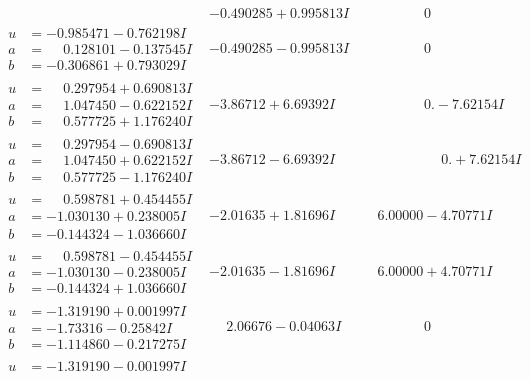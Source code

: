 \documentclass[1p]{elsarticle_modified}
\theoremstyle{definition}
\begin{document}
$$\begin{array}{c|c|c}
 & -0.490285 + 0.995813 I & \phantom{-0.000000 } 0 \\ \hline\begin{aligned}
u &= -0.985471 - 0.762198 I \\
a &= \phantom{-}0.128101 - 0.137545 I \\
b &= -0.306861 + 0.793029 I\end{aligned}
 & -0.490285 - 0.995813 I & \phantom{-0.000000 } 0 \\ \hline\begin{aligned}
u &= \phantom{-}0.297954 + 0.690813 I \\
a &= \phantom{-}1.047450 - 0.622152 I \\
b &= \phantom{-}0.577725 + 1.176240 I\end{aligned}
 & -3.86712 + 6.69392 I & \phantom{-0.000000 } 0. - 7.62154 I \\ \hline\begin{aligned}
u &= \phantom{-}0.297954 - 0.690813 I \\
a &= \phantom{-}1.047450 + 0.622152 I \\
b &= \phantom{-}0.577725 - 1.176240 I\end{aligned}
 & -3.86712 - 6.69392 I & \phantom{-0.000000 -}0. + 7.62154 I \\ \hline\begin{aligned}
u &= \phantom{-}0.598781 + 0.454455 I \\
a &= -1.030130 + 0.238005 I \\
b &= -0.144324 - 1.036660 I\end{aligned}
 & -2.01635 + 1.81696 I & \phantom{-}6.00000 - 4.70771 I \\ \hline\begin{aligned}
u &= \phantom{-}0.598781 - 0.454455 I \\
a &= -1.030130 - 0.238005 I \\
b &= -0.144324 + 1.036660 I\end{aligned}
 & -2.01635 - 1.81696 I & \phantom{-}6.00000 + 4.70771 I \\ \hline\begin{aligned}
u &= -1.319190 + 0.001997 I \\
a &= -1.73316 - 0.25842 I \\
b &= -1.114860 - 0.217275 I\end{aligned}
 & \phantom{-}2.06676 - 0.04063 I & \phantom{-0.000000 } 0 \\ \hline\begin{aligned}
u &= -1.319190 - 0.001997 I \\

\end{aligned}
\end{array}$$
\end{document}
